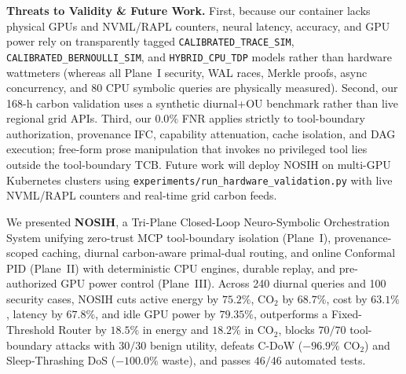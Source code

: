 \documentclass[10pt,twocolumn,letterpaper]{article}
\makeatletter
\renewcommand{\section}{\@startsection{section}{1}{\z@}{7pt plus 1.5pt minus 1.5pt}{3pt plus 1pt}{\centering\normalfont\normalsize\scshape}}
\makeatother
\begin{document}
\textbf{Threats to Validity \& Future Work.} First, because our container lacks physical GPUs and NVML/RAPL counters, neural latency, accuracy, and GPU power rely on transparently tagged \texttt{CALIBRATED\_TRACE\_SIM}, \texttt{CALIBRATED\_BERNOULLI\_SIM}, and \texttt{HYBRID\_CPU\_TDP} models rather than hardware wattmeters (whereas all Plane~I security, WAL races, Merkle proofs, async concurrency, and 80 CPU symbolic queries are physically measured). Second, our 168-h carbon validation uses a synthetic diurnal+OU benchmark rather than live regional grid APIs. Third, our $0.0\%$ FNR applies strictly to tool-boundary authorization, provenance IFC, capability attenuation, cache isolation, and DAG execution; free-form prose manipulation that invokes no privileged tool lies outside the tool-boundary TCB. Future work will deploy NOSIH on multi-GPU Kubernetes clusters using \texttt{experiments/run\_hardware\_validation.py} with live NVML/RAPL counters and real-time grid carbon feeds.

\section{Conclusion}
We presented \textbf{NOSIH}, a Tri-Plane Closed-Loop Neuro-Symbolic Orchestration System unifying zero-trust MCP tool-boundary isolation (Plane~I), provenance-scoped caching, diurnal carbon-aware primal-dual routing, and online Conformal PID (Plane~II) with deterministic CPU engines, durable replay, and pre-authorized GPU power control (Plane~III). Across 240 diurnal queries and 100 security cases, NOSIH cuts active energy by $75.2\%$, $\text{CO}_2$ by $68.7\%$, cost by $63.1\%$, latency by $67.8\%$, and idle GPU power by $79.35\%$, outperforms a Fixed-Threshold Router by $18.5\%$ in energy and $18.2\%$ in $\text{CO}_2$, blocks $70/70$ tool-boundary attacks with $30/30$ benign utility, defeats C-DoW ($-96.9\%$ $\text{CO}_2$) and Sleep-Thrashing DoS ($-100.0\%$ waste), and passes $46/46$ automated tests.
\end{document}
